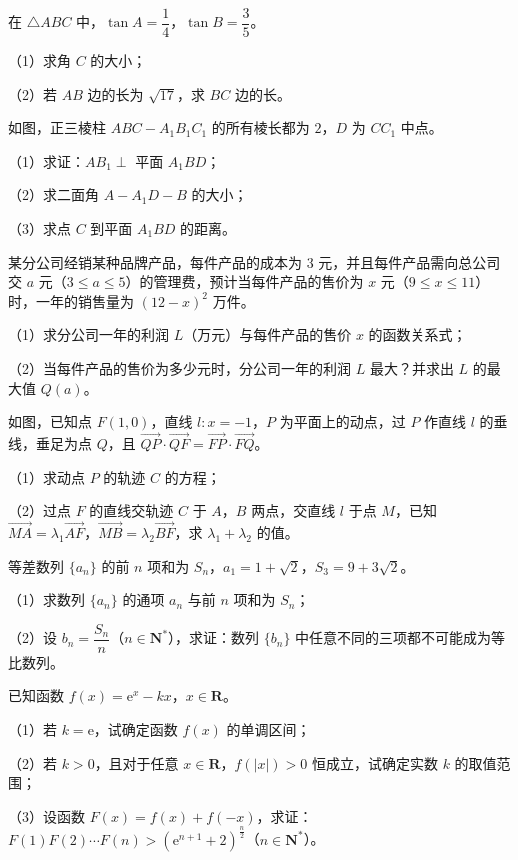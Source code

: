 \begingroup
\renewenvironment{question}{\Needspace{0.44\textheight}}{}
\begin{question}
在 $\triangle ABC$ 中，$\tan A=\dfrac14$，$\tan B=\dfrac35$。

（1）求角 $C$ 的大小；

（2）若 $AB$ 边的长为 $\sqrt{17}$，求 $BC$ 边的长。

\Needspace{0.4\textheight}
\end{question}
\endgroup
\begin{question}
如图，正三棱柱 $ABC-A_1B_1C_1$ 的所有棱长都为 $2$，$D$ 为 $CC_1$ 中点。

（1）求证：$AB_1\perp$ 平面 $A_1BD$；

（2）求二面角 $A-A_1D-B$ 的大小；

（3）求点 $C$ 到平面 $A_1BD$ 的距离。
\nopagebreak[4]
\begin{center}\end{center}
\nopagebreak[4]
\end{question}
\begin{question}
某分公司经销某种品牌产品，每件产品的成本为 $3$ 元，并且每件产品需向总公司交 $a$ 元（$3\leqslant a\leqslant5$）的管理费，预计当每件产品的售价为 $x$ 元（$9\leqslant x\leqslant11$）时，一年的销售量为 $(12-x)^2$ 万件。

（1）求分公司一年的利润 $L$（万元）与每件产品的售价 $x$ 的函数关系式；

（2）当每件产品的售价为多少元时，分公司一年的利润 $L$ 最大？并求出 $L$ 的最大值 $Q(a)$。

\Needspace{0.4\textheight}
\end{question}
\begin{question}
如图，已知点 $F(1,0)$，直线 $l:x=-1$，$P$ 为平面上的动点，过 $P$ 作直线 $l$ 的垂线，垂足为点 $Q$，且 $\overrightarrow{QP}\cdot\overrightarrow{QF}=\overrightarrow{FP}\cdot\overrightarrow{FQ}$。

（1）求动点 $P$ 的轨迹 $C$ 的方程；

（2）过点 $F$ 的直线交轨迹 $C$ 于 $A$，$B$ 两点，交直线 $l$ 于点 $M$，已知 $\overrightarrow{MA}=\lambda_1\overrightarrow{AF}$，$\overrightarrow{MB}=\lambda_2\overrightarrow{BF}$，求 $\lambda_1+\lambda_2$ 的值。
\nopagebreak[4]
\begin{center}\end{center}
\nopagebreak[4]
\end{question}
\begin{question}
等差数列 $\{a_n\}$ 的前 $n$ 项和为 $S_n$，$a_1=1+\sqrt2$，$S_3=9+3\sqrt2$。

（1）求数列 $\{a_n\}$ 的通项 $a_n$ 与前 $n$ 项和为 $S_n$；

（2）设 $b_n=\dfrac{S_n}n$（$n\in\mathbf N^*$），求证：数列 $\{b_n\}$ 中任意不同的三项都不可能成为等比数列。

\end{question}
\begin{question}
已知函数 $f(x)=\mathrm e^x-kx$，$x\in\mathbf R$。

（1）若 $k=\mathrm e$，试确定函数 $f(x)$ 的单调区间；

（2）若 $k>0$，且对于任意 $x\in\mathbf R$，$f(|x|)>0$ 恒成立，试确定实数 $k$ 的取值范围；

（3）设函数 $F(x)=f(x)+f(-x)$，求证：$F(1)F(2)\cdots F(n)>(\mathrm e^{n+1}+2)^{\frac n2}$（$n\in\mathbf N^*$）。

\end{question}